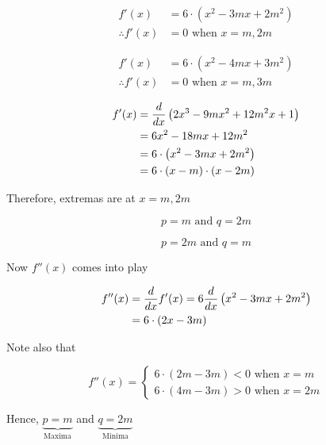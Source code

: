 \documentclass[14pt,fleqn]{extarticle}
\newcommand\fx{2x^3 - 9mx^2 + 12m^2 x + 1}
\begin{document}
\begin{question}
\begin{step}
  \begin{options} 
     \correct 
       
       \begin{align}
	f'(x) &= 6\cdot \left(x^2 - 3mx + 2m^2 \right) \\
	\therefore f'(x) &= 0 \text{ when } x = m, 2m 
\end{align}
     \incorrect
        
        \begin{align}
	f'(x) &= 6\cdot \left(x^2 - 4mx + 3m^2 \right) \\
	\therefore f'(x) &= 0 \text{ when } x = m, 3m 
\end{align}
    \end{options} 
     \reason 
       
       \begin{align}
	f'(x) &= \ddx \left(\fx \right) \\
	&= 6x^2 - 18mx + 12m^2 \\ 
	&= 6\cdot \left(x^2 - 3mx + 2m^2 \right) \\
	&= 6\cdot \left(x-m \right)\cdot \left(x-2m \right)
\end{align}

Therefore, extremas are at $x = m, 2m$
\end{step}

\begin{step}
  \begin{options} 
     \correct 
       
       \[ p = m\text{ and } q = 2m \]
     \incorrect
        
        \[ p = 2m\text{ and } q = m \]
    \end{options} 
     \reason 
       
       Now $f''(x)$ comes into play 
       
       \begin{align}
		f''(x) &= \frac{d}{dx} f'(x) = 6 \frac{d}{dx} \left(x^2 - 3mx + 2m^2 \right) \\
		&= 6\cdot \left(2x - 3m \right)
\end{align}

Note also that 

\[ f''(x) = \begin{cases} 
6\cdot (2m-3m) < 0 \text{ when } x = m \\
6\cdot (4m - 3m) > 0\text{ when } x = 2m 
\end{cases} \]

Hence, $\underbrace{p = m}_{\text{Maxima}}$ and $\underbrace{q = 2m}_{\text{Minima}}$ 
\end{step}


\end{question}
\end{document}

